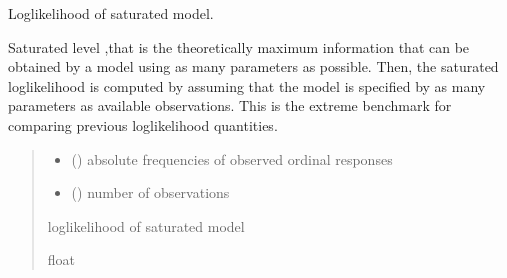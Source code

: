 \documentclass[letterpaper,10pt,english]{sphinxmanual}
\begin{document}
\begin{fulllineitems}
\label{\detokenize{cubmods:cubmods.general.lsat}}
\pysigstartsignatures
{}
\pysigstopsignatures
\sphinxAtStartPar
Log\sphinxhyphen{}likelihood of saturated model.

\sphinxAtStartPar
Saturated level ,that is the theoretically maximum information
that can be obtained by a model using as many parameters as possible. 
Then, the saturated log\sphinxhyphen{}likelihood is computed by assuming that the model 
is specified by as many parameters as available observations. 
This is the extreme benchmark for comparing
previous log\sphinxhyphen{}likelihood quantities.
\begin{quote}\begin{description}
\begin{itemize}
\item {} 
\sphinxAtStartPar
{} () \textendash{} absolute frequencies of observed ordinal responses

\item {} 
\sphinxAtStartPar
{} () \textendash{} number of observations

\end{itemize}

\sphinxAtStartPar
log\sphinxhyphen{}likelihood of saturated model

\sphinxAtStartPar
float

\end{description}\end{quote}

\end{fulllineitems}

\end{document}
